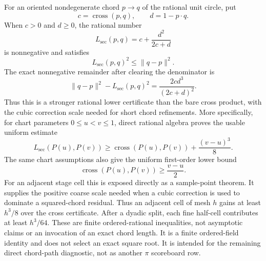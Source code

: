 \begin{theorem}
\label{thm:rational-secant-lower}
\leanok
For an oriented nondegenerate chord \(p\mathbin{\to}q\) of the rational unit
circle, put
\[
 c=\operatorname{cross}(p,q),\qquad d=1-p\mathbin{\cdot}q.
\]
When \(c>0\) and \(d\ge0\), the rational number
\[
 L_{\mathrm{sec}}(p,q)=c+\frac{d^2}{2c+d}
\]
is nonnegative and satisfies
\[
 L_{\mathrm{sec}}(p,q)^2\le\lVert q-p\rVert^2.
\]
The exact nonnegative remainder after clearing the denominator is
\[
 \lVert q-p\rVert^2-L_{\mathrm{sec}}(p,q)^2
   =\frac{2cd^3}{(2c+d)^2}.
\]
Thus this is a stronger rational lower certificate than the bare cross
product, with the cubic correction scale needed for short chord refinements.
More specifically, for chart parameters \(0\le u<v\le1\), direct rational
algebra proves the usable uniform estimate
\[
L_{\mathrm{sec}}(P(u),P(v))
 \ge \operatorname{cross}(P(u),P(v))+\frac{(v-u)^3}{8}.
\]
The same chart assumptions also give the uniform first-order lower bound
\[
 \operatorname{cross}(P(u),P(v))\ge\frac{v-u}{2}.
\]
For an adjacent stage cell this is exposed directly as a sample-point theorem.
It supplies the positive coarse scale needed when a cubic correction is used
to dominate a squared-chord residual.
Thus an adjacent cell of mesh \(h\) gains at least \(h^3/8\) over the cross
certificate.  After a dyadic split, each fine half-cell contributes at least
\(h^3/64\).  These are finite ordered-rational inequalities, not asymptotic
claims or an invocation of an exact chord length.
It is a finite ordered-field identity and does not select an exact square
root.  It is intended for the remaining direct chord-path diagnostic, not as
another \(\pi\) scoreboard row.
\end{theorem}

